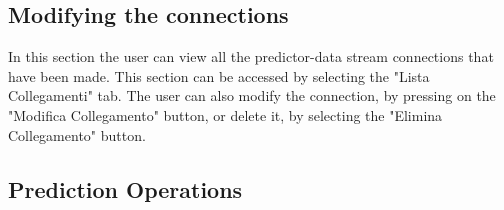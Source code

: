 \subsection{Modifying the connections}
In this section the user can view all the predictor-data stream connections that have been made. This section can be accessed by selecting the "Lista Collegamenti" tab.
The user can also modify the connection, by pressing on the "Modifica Collegamento" button, or delete it, by selecting the "Elimina Collegamento" button.

\subsection{Prediction Operations}
